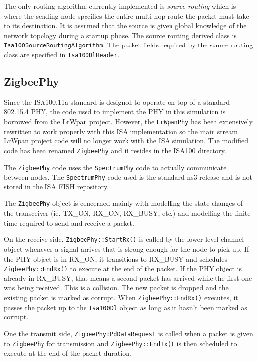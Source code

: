 \documentclass[12pt,letterpaper]{article}
\begin{document}
The only routing algorithm currently implemented is {\em source routing} which is where the sending node specifies the entire multi-hop route the packet must take to its destination.  It is assumed that the source is given global knowledge of the network topology during a startup phase.  The source routing derived class is {\tt Isa100SourceRoutingAlgorithm}.  The packet fields required by the source routing class are specified in {\tt Isa100DlHeader}.



\subsection{ZigbeePhy}

Since the ISA100.11a standard is designed to operate on top of a standard 802.15.4 PHY, the code used to implement the PHY in this simulation is borrowed from the LrWpan project.  However, the {\tt LrWpanPhy} has been extensively rewritten to work properly with this ISA implementation so the main stream LrWpan project code will no longer work with the ISA simulation.  The modified code has been renamed {\tt ZigbeePhy} and it resides in the ISA100 directory.

The {\tt ZigbeePhy} code uses the {\tt SpectrumPhy} code to actually communicate between nodes.  The {\tt SpectrumPhy} code used is the standard ns3 release and is not stored in the ISA FISH repository.

The {\tt ZigbeePhy} object is concerned mainly with modelling the state changes of the transceiver (ie. TX\_ON, RX\_ON, RX\_BUSY, etc.) and modelling the finite time required to send and receive a packet.

On the receive side, {\tt ZigbeePhy::StartRx()} is called by the lower level channel object whenever a signal arrives that is strong enough for the node to pick up.  If the PHY object is in RX\_ON, it transitions to RX\_BUSY and schedules {\tt ZigbeePhy::EndRx()} to execute at the end of the packet.  If the PHY object is already in RX\_BUSY, that means a second packet has arrived while the first one was being received.  This is a collision.  The new packet is dropped and the existing packet is marked as corrupt.  When {\tt ZigbeePhy::EndRx()} executes, it passes the packet up to the {\tt Isa100Dl} object as long as it hasn't been marked as corrupt.

One the transmit side, {\tt ZigbeePhy:PdDataRequest} is called when a packet is given to {\tt ZigbeePhy} for transmission and {\tt ZigbeePhy::EndTx()} is then scheduled to execute at the end of the packet duration.
\end{document}
